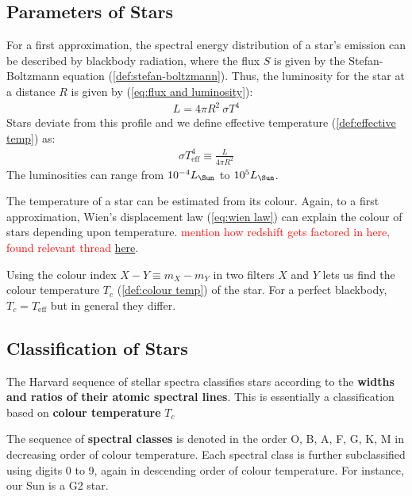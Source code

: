 \documentclass[a4paper,11pt]{report}
\newcommand{\red}[1]{\textcolor{red}{#1}}
\begin{document}
\subsection{Parameters of Stars}

For a first approximation, the spectral energy distribution of a star's emission can be described by blackbody radiation, where the flux $S$ is given by the Stefan-Boltzmann equation (\ref{def:stefan-boltzmann}). Thus, the luminosity for the star at a distance $R$ is given by (\ref{eq:flux and luminosity}):
\begin{align*}
  L = 4 \pi R^2 \ \sigma T^4
\end{align*}
Stars deviate from this profile and we define effective temperature (\ref{def:effective temp}) as:
\begin{align}
  \sigma T_\text{eff}^4 \equiv \frac{L}{4 \pi R^2} \label{eq:eff temperature}
\end{align}
The luminosities can range from $10^{-4} L_\text{\Sun}$ to $10^5 L_\text{\Sun}$.

\vspace{1em}

The temperature of a star can be estimated from its colour. Again, to a first approximation, Wien's displacement law (\ref{eq:wien law}) can explain the colour of stars depending upon temperature. \red{mention how redshift gets factored in here, found relevant thread \href{https://physics.stackexchange.com/questions/827040/wiens-displacement-law}{here}}.

\vspace{1em}

Using the colour index $X - Y \equiv m_X - m_Y$ in two filters $X$ and $Y$ lets us find the colour temperature $T_c$ (\ref{def:colour temp}) of the star. For a perfect blackbody, $T_c = T_\text{eff}$ but in general they differ.

\subsection{Classification of Stars}
The Harvard sequence of stellar spectra classifies stars according to the \textbf{widths and ratios of their atomic spectral lines}. This is essentially a classification based on \textbf{colour temperature} $T_c$ 

\vspace{1em}
The sequence of \textbf{spectral classes} is denoted in the order O, B, A, F, G, K, M in decreasing order of colour temperature. Each spectral class is further subclassified using digits 0 to 9, again in descending order of colour temperature. For instance, our Sun is a G2 star.
\end{document}
